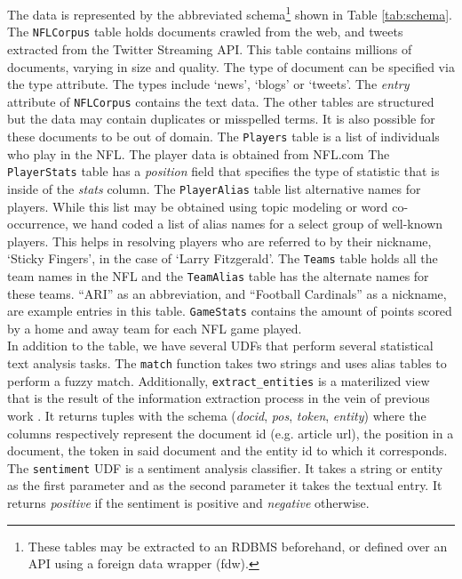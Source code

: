 The data is represented by the abbreviated schema\footnote{These tables may be
extracted to an RDBMS beforehand, or defined over an API
using a foreign data wrapper (fdw).} shown in Table \ref{tab:schema}.
The {\tt NFLCorpus} table holds documents crawled from the web,
and tweets extracted from the Twitter Streaming API. This table contains
millions of documents, varying in size and quality. The type of document 
can be specified via the type attribute. The types include `news', `blogs' or
`tweets'. The \textit{entry} attribute of {\tt NFLCorpus} contains the text data.
The other tables are structured but the data may contain duplicates or
misspelled terms. It is also possible for these documents to be out of domain.
The {\tt Players} table is a list of individuals
who play in the NFL. The player data is obtained from NFL.com
The {\tt PlayerStats} table has a \textit{position} field that specifies
the type of statistic that is inside of the \textit{stats} column.
The {\tt PlayerAlias} table list alternative names for players.
While this list may be obtained using topic modeling or word
co-occurrence, we hand coded a list of alias names for a select
group of well-known players. This helps in resolving players who are
referred to by their nickname, `Sticky Fingers', in the case of
`Larry Fitzgerald'.
The {\tt Teams} table holds all the team
names in the NFL and the {\tt TeamAlias} table has the alternate names for these
teams. ``ARI'' as an abbreviation,  and ``Football Cardinals'' as a nickname, are 
example entries in this table. {\tt GameStats} contains the amount of points scored by a 
home and away team for each NFL game played.\\


In addition to the table, we have several UDFs that perform several statistical
text analysis tasks. The {\tt match} function takes two strings and
uses alias tables to perform a fuzzy match.
Additionally, {\tt extract\_entities} is a materilized view that is the
result of the information extraction process in the vein of previous work
\cite{wang2010probabilistic}.
It returns tuples with the schema
(\textit{docid}, \textit{pos}, \textit{token}, \textit{entity}) where the
columns respectively represent
the document id (e.g. article url), the position in a document, the token
in said document and the entity id to which it corresponds.
The {\tt sentiment} UDF is a sentiment analysis classifier.
It takes a string or entity as the first parameter and as the second parameter
it takes the textual entry. It returns \textit{positive} if the sentiment is
positive and \textit{negative} otherwise.

